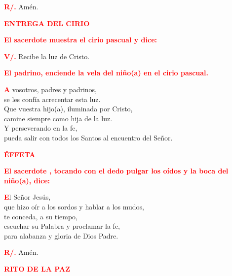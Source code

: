 \documentclass[12pt, letterpaper]{report}
\begin{document}
\noindent
\Large {\bfseries \textcolor{red}{R/.}} \hspace{0.5cm} Am\'en. \newline

\Large {\bfseries \textcolor{red}{ENTREGA DEL CIRIO}} \newline

\large {\bfseries \textcolor{red}{El sacerdote muestra el cirio pascual y dice:}} \newline

\noindent
\Large {\bfseries \textcolor{red}{V/.}} \hspace{0.5cm} Recibe la luz de Cristo. \newline

\large {\bfseries \textcolor{red}{El padrino, enciende la vela del ni\~no(a) en el cirio pascual.}} \newline

\lettrine[lines=1]{\bfseries \textcolor{red}{A}}{} \Large vosotros, padres y padrinos, \\
se les conf\'ia acrecentar esta luz.\\
Que vuestra hijo(a), iluminada por Cristo, \\
camine siempre como hija de la luz. \\
Y perseverando en la fe, \\
pueda salir con todos los Santos al encuentro del Se\~nor. \newline

\Large {\bfseries \textcolor{red}{ \'EFFETA}} \newline

\large {\bfseries \textcolor{red}{El sacerdote , tocando con el dedo pulgar los o\'idos y la boca del ni\~no(a), dice:}} \newline

\lettrine[lines=1]{\bfseries \textcolor{red}{E}}{}\Large l Se\~nor Jes\'us, \\
que hizo o\'ir a los sordos y hablar a los mudos, \\
te conceda, a su tiempo, \\
escuchar su Palabra y proclamar la fe, \\
para alabanza y gloria de Dios Padre. \newline

\noindent
\Large {\bfseries \textcolor{red}{R/.}} \hspace{0.5cm} Am\'en. \newline

\Large {\bfseries \textcolor{red}{RITO DE LA PAZ}} \newline
\end{document}
